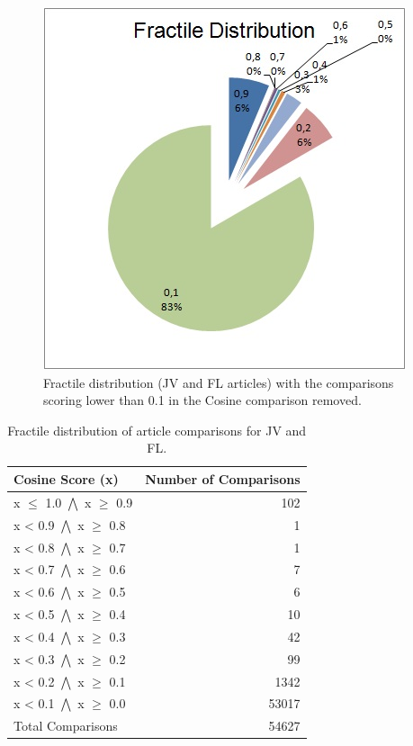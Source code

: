 \begin{figure}
	\centering
	\includegraphics[scale=1.0]{figures/JVFLFractile}
	\caption{Fractile distribution (JV and FL articles) with the comparisons scoring lower than 0.1 in the Cosine comparison removed.}
	\label{JVFLFractile}
\end{figure}

\begin{table}
\begin{center}
	\begin{tabular}{l | r}
		Cosine Score (x) & Number of Comparisons\\ \hline
		x $\leq$ 1.0 $\bigwedge$ x $\geq$ 0.9 & 102 \\ \hline
		x < 0.9 $\bigwedge$ x $\geq$ 0.8 & 1 \\ \hline
		x < 0.8 $\bigwedge$ x $\geq$ 0.7 & 1 \\ \hline
		x < 0.7 $\bigwedge$ x $\geq$ 0.6 & 7 \\ \hline
		x < 0.6 $\bigwedge$ x $\geq$ 0.5 & 6 \\ \hline
		x < 0.5 $\bigwedge$ x $\geq$ 0.4 & 10 \\ \hline
		x < 0.4 $\bigwedge$ x $\geq$ 0.3 & 42 \\ \hline
		x < 0.3 $\bigwedge$ x $\geq$ 0.2 & 99 \\ \hline
		x < 0.2 $\bigwedge$ x $\geq$ 0.1 & 1342 \\ \hline
		x < 0.1 $\bigwedge$ x $\geq$ 0.0 & 53017 \\ \hline	
		Total Comparisons & 54627 \\ \hline
	\end{tabular}
\end{center}
\caption{Fractile distribution of article comparisons for JV and FL.}\label{Test2Fractile}
\end{table}


